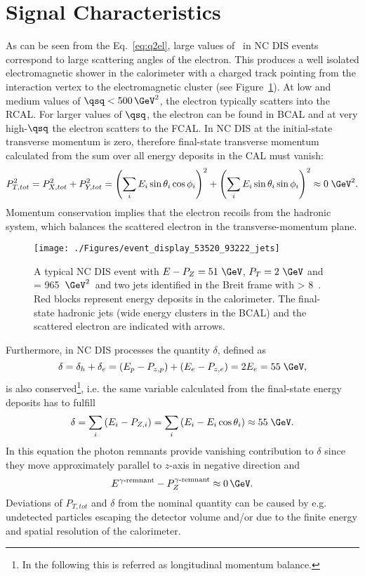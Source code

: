 \section{Signal Characteristics}
\label{sec:signalchar}
As can be seen from the Eq.~\eqref{eq:q2el}, large values of \qsq\, in NC DIS events correspond to large scattering angles of the electron. This produces a well isolated electromagnetic shower in the calorimeter with a charged track pointing from the interaction vertex to the electromagnetic cluster (see Figure~\ref{fig:ncdiseventdisplay}). At low and medium values of $\qsq < 500\, \GeV^2$, the electron typically scatters into the RCAL. For larger values of $\qsq$, the electron can be found in BCAL and at very high-$\qsq$ the electron scatters to the FCAL. In NC DIS at \hera the initial-state transverse momentum is zero, therefore final-state transverse momentum calculated from the sum over all energy deposits in the CAL must vanish:
\begin{equation}
P_{T,tot}^2 = P_{X,tot}^2+P_{Y,tot}^2 = \left(\sum_i{E_i\sin{\theta_i}\cos{\phi_i}}\right)^2 + \left(\sum_i{E_i\sin{\theta_i}\sin{\phi_i}}\right)^2 \approx 0\;\GeV^2.
\end{equation}
 Momentum conservation implies that the electron recoils from the hadronic system, which balances the scattered electron in the transverse-momentum plane.
\begin{figure}[htbp]
	\centering
	\texttt{[image: ./Figures/event\_display\_53520\_93222\_jets]} 
	\caption{A typical NC DIS event with $E-P_Z=51~\GeV$, $P_T=2~\GeV$ and \qsq = 965~$\GeV^2$~and two jets identified in the Breit frame with \etjetb> 8~\GeV. Red blocks represent energy deposits in the calorimeter. The final-state hadronic jets (wide energy clusters in the BCAL) and the scattered electron are indicated with arrows.}
	\label{fig:ncdiseventdisplay}
\end{figure}

Furthermore, in NC DIS processes the quantity $\delta$, defined as
\begin{equation}
\delta = \delta_h + \delta_e = \left( E_p - P_{z,p} \right) + \left( E_e - P_{z,e}\right) = 2E_e = 55\;\GeV,
\label{eq:deltadis}
\end{equation}
is also conserved\footnote{In the following this is referred as longitudinal momentum balance.}, i.e. the same variable calculated from the final-state energy deposits has to fulfill
\begin{equation}
\delta = \sum_i{\left(E_i - P_{Z,i}\right)} = \sum_i{\left(E_i - E_i\cos{\theta_i}\right)} \approx 55\;\GeV.
\end{equation}
In this equation the photon remnants provide vanishing contribution to $\delta$ since they move approximately parallel to $z$-axis in negative direction and 
\begin{equation}
E^{\gamma\text{-remnant}}-P_{Z}^{\gamma\text{-remnant}} \approx 0\,\GeV.
\end{equation}
Deviations of $P_{T,tot}$ and $\delta$ from the nominal quantity can be caused by e.g. undetected particles escaping the  detector volume and/or due to the finite energy and spatial resolution of the calorimeter.

